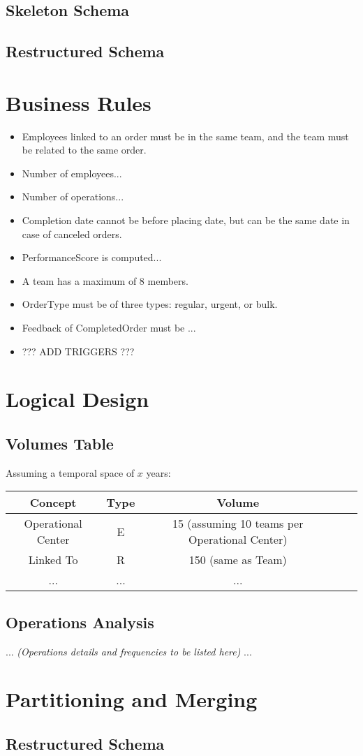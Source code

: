\subsection{Skeleton Schema}


\subsection{Restructured Schema}


\section{Business Rules}
\begin{itemize}
    \item Employees linked to an order must be in the same team, and the team must be related to the same order.
    \item Number of employees...
    \item Number of operations...
    \item Completion date cannot be before placing date, but can be the same date in case of canceled orders.
    \item PerformanceScore is computed...
    \item A team has a maximum of 8 members.
    \item OrderType must be of three types: regular, urgent, or bulk.
    \item Feedback of CompletedOrder must be ...
    \item ??? ADD TRIGGERS ???
\end{itemize}

\section{Logical Design}
\subsection{Volumes Table}
Assuming a temporal space of \(x\) years:

\begin{table}[h!]
\begin{tabular}{|c|c|c|c|c|}
\hline
\textbf{Concept} & \textbf{Type} & \textbf{Volume} \\
\hline
Operational Center & E & 15 (assuming 10 teams per Operational Center) \\
\hline
Linked To & R & 150 (same as Team) \\
\hline
... & ... & ... \\
\hline
\end{tabular}
\end{table}

\subsection{Operations Analysis}
... \textit{(Operations details and frequencies to be listed here)} ...

\section{Partitioning and Merging}

\subsection{Restructured Schema}

